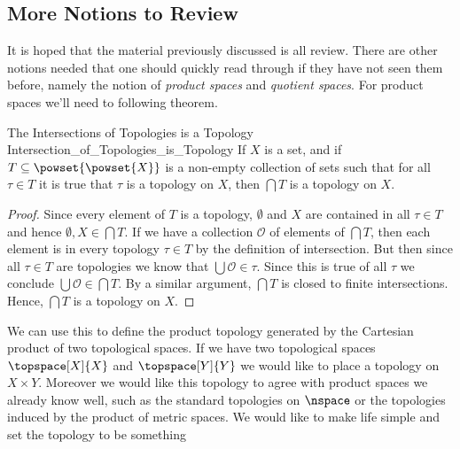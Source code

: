 \documentclass[oneside]{book}                                                  %
\begin{document}
            \subsection{More Notions to Review}
                It is hoped that the material previously discussed is all
                review. There are other notions needed that one should quickly
                read through if they have not seen them before, namely the
                notion of \textit{product spaces} and \textit{quotient spaces}.
                For product spaces we'll need to following theorem.
                \begin{ltheorem}{The Intersections of Topologies is a Topology}
                                {Intersection_of_Topologies_is_Topology}
                    If $X$ is a set, and if $T\subseteq\powset{\powset{X}}$ is a
                    non-empty collection of sets such that for all $\tau\in{T}$
                    it is true that $\tau$ is a topology on $X$, then
                    $\bigcap{T}$ is a topology on $X$.
                \end{ltheorem}
                \begin{proof}
                    Since every element of $T$ is a topology, $\emptyset$ and
                    $X$ are contained in all $\tau\in{T}$ and hence
                    $\emptyset,X\in\bigcap{T}$. If we have a collection
                    $\mathcal{O}$ of elements of $\bigcap{T}$, then each element
                    is in every topology $\tau\in{T}$ by the definition of
                    intersection. But then since all $\tau\in{T}$ are topologies
                    we know that $\bigcup\mathcal{O}\in\tau$. Since this is true
                    of all $\tau$ we conclude $\bigcup\mathcal{O}\in\bigcap{T}$.
                    By a similar argument, $\bigcap{T}$ is closed to finite
                    intersections. Hence, $\bigcap{T}$ is a topology on $X$.
                \end{proof}
                We can use this to define the product topology generated by the
                Cartesian product of two topological spaces. If we have two
                topological spaces $\topspace[X]{X}$ and $\topspace[Y]{Y}$ we
                would like to place a topology on $X\times{Y}$. Moreover we
                would like this topology to agree with product spaces we already
                know well, such as the standard topologies on $\nspace$ or the
                topologies induced by the product of metric spaces. We would
                like to make life simple and set the topology to be something
\end{document}
